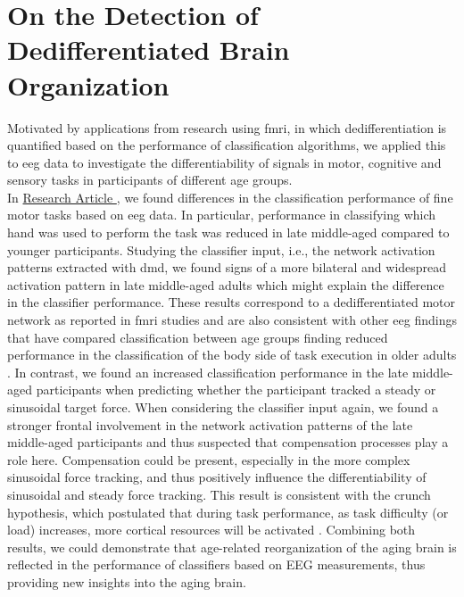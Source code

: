 \section{On the Detection of Dedifferentiated Brain Organization}
Motivated by applications from research using \gls{fmri}, in which dedifferentiation is quantified based on the performance of classification algorithms, we applied this to \gls{eeg} data to investigate the differentiability of signals in motor, cognitive and sensory tasks in participants of different age groups.\\
In \hyperref[results:paperI]{Research Article }, we found differences in the classification performance of fine motor tasks based on \gls{eeg} data. In particular, performance in classifying which hand was used to perform the task was reduced in late middle-aged compared to younger participants. Studying the classifier input, i.e., the network activation patterns extracted with \gls{dmd}, we found signs of a more bilateral and widespread activation pattern in late middle-aged adults which might explain the difference in the classifier performance. These results correspond to a dedifferentiated motor network as reported in \gls{fmri} studies and are also consistent with other \gls{eeg} findings that have compared classification between age groups finding reduced performance in the classification of the body side of task execution in older adults \cite{Chen2019, Zich2015, Carb2011, Cassedy2020}. In contrast, we found an increased classification performance in the late middle-aged participants when predicting whether the participant tracked a steady or sinusoidal target force. When considering the classifier input again, we found a stronger frontal involvement in the network activation patterns of the late middle-aged participants and thus suspected that compensation processes play a role here. Compensation could be present, especially in the more complex sinusoidal force tracking, and thus positively influence the differentiability of sinusoidal and steady force tracking. This result is consistent with the \gls{crunch} hypothesis, which postulated that during task performance, as task difficulty (or load) increases, more cortical resources will be activated \cite{Festini2018}. Combining both results, we could demonstrate that age-related reorganization of the aging brain is reflected in the performance of classifiers based on EEG measurements, thus providing new insights into the aging brain.\\
